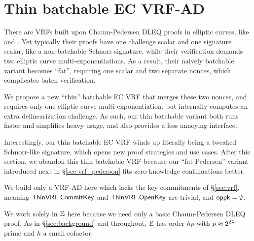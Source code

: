 
\section{Thin batchable EC VRF-AD}
\label{sec:vrf_thin}

There are VRFs built upon Chaum-Pedersen DLEQ proofs in elliptic curves,
 like \cite{nsec5} and \cite{VXEd25519}.
Yet typically their proofs have one challenge scalar and one signature
scalar, like a non-batchable Schnorr signature, while 
their verification demands two elliptic curve multi-exponentiations.
As a result, their naively batchable variant becomes ``fat'', requiring
one scalar and two separate nonces, which complicates batch verification.

We propose a new ``thin'' batchable EC VRF that merges these two nonces,
and requires only one elliptic curve multi-exponentiation, but
internally computes an extra delinearization challenge.
As such, our thin batchable variant both runs faster and simplifies heavy usage,
and also provides a less annoying interface.

Interestingly, our thin batchable EC VRF winds up literally being
a tweaked Schnorr-like signature, which opens new proof strategies and
use cases.  After this section, we abandon this thin batchable VRF
because our ``fat Pedersen'' variant introduced next in \S\ref{sec:vrf_pederson}
fits zero-knowledge continuations better.

\smallskip

\newcommand{\ThinVRF}{\primalgo{ThinVRF}} 


We build only a VRF-AD here which lacks the key commitments of \S\ref{sec:vrf},
meaning $\ThinVRF.\CommitKey$ and $\ThinVRF.\OpenKey$ are trivial, and $\mathsf{oppk} = \emptyset$.

We work solely in ${\mathbb{E}}$ here because we need only a basic Chaum-Pedersen DLEQ proof.
As in \S\ref{sec:background} and throughout,
 ${\mathbb{E}}$ has order $h p$ with $p \approx 2^{2\lambda}$ prime and $h$ a small cofactor.

